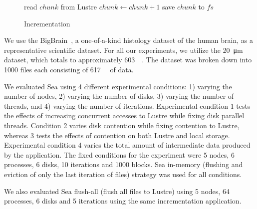 \documentclass[10pt,journal,compsoc]{IEEEtran}
\makeatletter
\newcommand{\removelatexerror}{\let\@latex@error\@gobble}
\makeatother
\begin{document}
      \begin{figure}[!t]
        \removelatexerror
        \begin{algorithm}[H]
          \caption{Incrementation}\label{alg:sea-comp:incrementation}
          \SetAlgoLined {}   { read $chunk$ from Lustre  { $chunk\gets chunk+1$ save $chunk$ to $fs$ } }
        \end{algorithm}
      \end{figure}

      We use the BigBrain~\cite{amunts2013bigbrain}, a one-of-a-kind histology
      dataset of the human brain, as a representative scientific dataset. For
      all our experiments, we utilize the \SI{20}{\micro\meter} dataset, which
      totals to approximately \SI{603}{\gibi\byte}. The dataset was broken down
      into 1000 files each consisting of \SI{617}{\mebi\byte} of data.
      
                                                                                   
      We evaluated Sea using 4 different experimental conditions: 1) varying the
      number of nodes, 2) varying the number of disks, 3) varying the number of
      threads, and 4) varying the number of iterations. Experimental condition 1
      tests the effects of increasing concurrent accesses to Lustre while fixing
      disk parallel threads. Condition 2 varies disk contention while fixing
      contention to Lustre, whereas 3 tests the effects of contention on both
      Lustre and local storage. Experimental condition 4 varies the total amount
      of intermediate data produced by the application. The fixed conditions for
      the experiment were 5 nodes, 6 processes, 6 disks, 10 iterations and 1000
      blocks. Sea in-memory (flushing and eviction of only the last iteration of
      files) strategy was used for all conditions.
      
      We also evaluated Sea flush-all (flush all files to Lustre) using 5 nodes,
      64 processes, 6 disks and 5 iterations using the same incrementation
      application.
\end{document}
